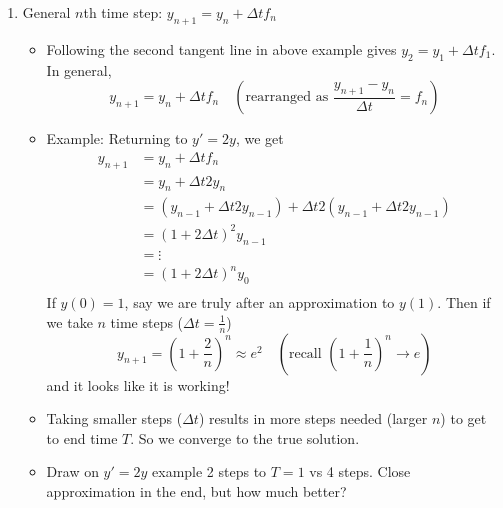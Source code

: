 \documentclass{article}
\begin{document}
\begin{enumerate}
\begin{enumerate}
\item General $n$th time step: $y_{n+1}=y_n+\Delta t f_n$
\begin{itemize}
\item Following the second tangent line in above example gives $y_2=y_1 + \Delta t f_1$. In general,
\[
y_{n+1}=y_n+\Delta t f_n \quad \left(\text{rearranged as } \frac{y_{n+1}-y_n}{\Delta t} = f_n \right)
\]
\item Example: Returning to $y' = 2y$, we get 
\begin{align*}
y_{n+1} 
&= y_n + \Delta t f_n \\
&= y_n + \Delta t 2 y_n \\
&= (y_{n-1}+\Delta t 2 y_{n-1}) + \Delta t 2 (y_{n-1}+\Delta t 2 y_{n-1}) \\
&= (1+2\Delta t)^2 y_{n-1} \\
&= \vdots \\
&= (1+2\Delta t)^n y_0 \\
\end{align*}
If $y(0)=1$, say we are truly after an approximation to $y(1)$. Then if we take $n$ time steps ($\Delta t = \frac{1}{n}$)
\[
y_{n+1} = \left(1+\frac{2}{n} \right)^n \approx e^{2} \quad \left( \text{recall } (1+\frac{1}{n})^n \rightarrow e \right)
\]
and it looks like it is working!
\item Taking smaller steps ($\Delta t$) results in more steps needed (larger $n$) to get to end time $T$. So we converge to the true solution.
\item Draw on $y'=2y$ example 2 steps to $T=1$ vs 4 steps. Close approximation in the end, but how much better?
\end{itemize}

\end{enumerate}


\end{enumerate}
\end{document}

